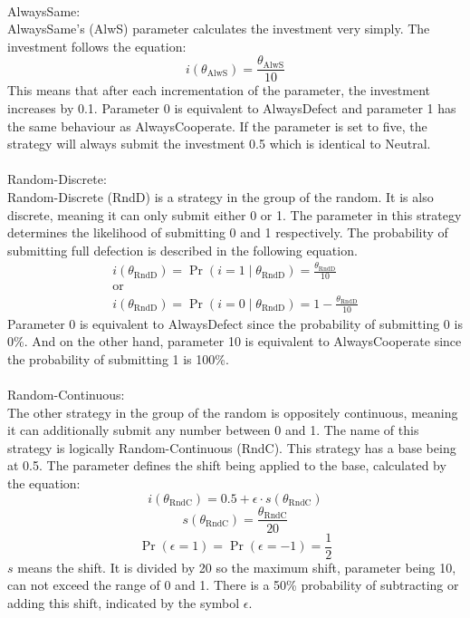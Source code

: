 \documentclass{article}
\begin{document}
\begin{itemize}
		\\AlwaysSame:\\
AlwaysSame's (AlwS) parameter calculates the investment very simply.
The investment follows the equation: 
$$i(\theta_{\mathrm{AlwS}}) = \frac{\theta_{\mathrm{AlwS}}}{10}$$
This means that after each incrementation of the parameter, the investment increases by 0.1.
Parameter 0 is equivalent to AlwaysDefect and parameter 1 has the same behaviour as AlwaysCooperate.
If the parameter is set to five, the strategy will always submit the investment 0.5 which is identical to Neutral.\\
		\\Random-Discrete:\\
Random-Discrete (RndD) is a strategy in the group of the random.
It is also discrete, meaning it can only submit either 0 or 1.
The parameter in this strategy determines the likelihood of submitting 0 and 1 respectively.
The probability of submitting full defection is described in the following equation.
$$
\begin{array}{c}
i(\theta_{\mathrm{RndD}}) = \Pr(i = 1 \mid \theta_{\mathrm{RndD}}) = \frac{\theta_{\mathrm{RndD}}}{10}\\
\mathrm{or}\\
i(\theta_{\mathrm{RndD}}) = \Pr(i = 0 \mid \theta_{\mathrm{RndD}}) = 1 - \frac{\theta_{\mathrm{RndD}}}{10}
\end{array}
$$
Parameter 0 is equivalent to AlwaysDefect since the probability of submitting 0 is 0\%.
And on the other hand, parameter 10 is equivalent to AlwaysCooperate since the probability of submitting 1 is 100\%.\\
		\\Random-Continuous:\\
The other strategy in the group of the random is oppositely continuous, meaning it can additionally submit any number between 0 and 1.
The name of this strategy is logically Random-Continuous (RndC).
This strategy has a base being at 0.5.
The parameter defines the shift being applied to the base, calculated by the equation:
$$i(\theta_{\mathrm{RndC}}) = 0.5 + \epsilon \cdot s(\theta_{\mathrm{RndC}})$$
$$s(\theta_{\mathrm{RndC}}) = \frac{\theta_{\mathrm{RndC}}}{20}$$
$$\Pr(\epsilon = 1) = \Pr(\epsilon = -1) = \frac{1}{2}$$
$s$ means the shift.
It is divided by 20 so the maximum shift, parameter being 10, can not exceed the range of 0 and 1.
There is a 50\% probability of subtracting or adding this shift, indicated by the symbol $\epsilon$.


\end{itemize}
\end{document}

